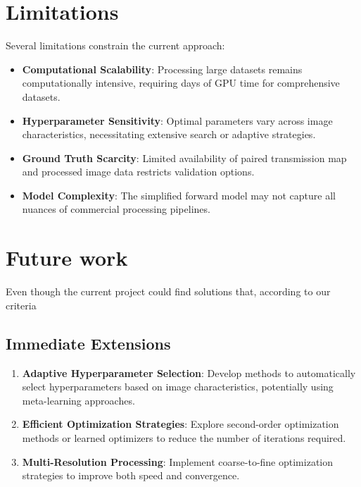 \documentclass[nomenclature, english, bibtex]{kththesis}
\numberwithin{listing}{chapter}
\begin{document}
\section{Limitations}
\label{sec:limitations}

Several limitations constrain the current approach:

\begin{itemize}
    \item \textbf{Computational Scalability}: Processing large datasets remains computationally intensive, requiring days of GPU time for comprehensive datasets.

    \item \textbf{Hyperparameter Sensitivity}: Optimal parameters vary across image characteristics, necessitating extensive search or adaptive strategies.

    \item \textbf{Ground Truth Scarcity}: Limited availability of paired transmission map and processed image data restricts validation options.

    \item \textbf{Model Complexity}: The simplified forward model may not capture all nuances of commercial processing pipelines.
\end{itemize}

\section{Future work}
\label{sec:futureWork}

Even though the current project could find solutions that, according to our criteria

\subsection{Immediate Extensions}
\begin{enumerate}
    \item \textbf{Adaptive Hyperparameter Selection}: Develop methods to automatically select hyperparameters based on image characteristics, potentially using meta-learning approaches.

    \item \textbf{Efficient Optimization Strategies}: Explore second-order optimization methods or learned optimizers to reduce the number of iterations required.

    \item \textbf{Multi-Resolution Processing}: Implement coarse-to-fine optimization strategies to improve both speed and convergence.
\end{enumerate}
\end{document}
